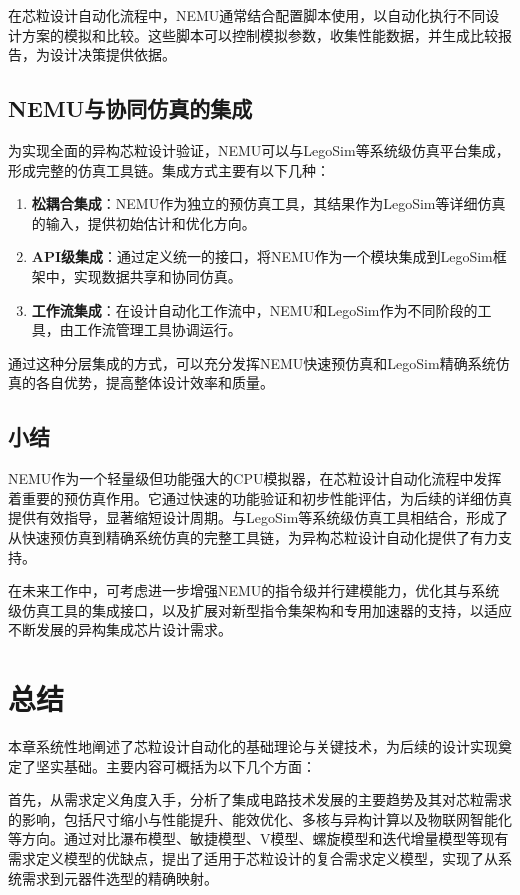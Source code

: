 \documentclass[bachelor]{thesis-uestc}
\begin{document}
在芯粒设计自动化流程中，NEMU通常结合配置脚本使用，以自动化执行不同设计方案的模拟和比较。这些脚本可以控制模拟参数，收集性能数据，并生成比较报告，为设计决策提供依据。

\subsection{NEMU与协同仿真的集成}
为实现全面的异构芯粒设计验证，NEMU可以与LegoSim等系统级仿真平台集成，形成完整的仿真工具链。集成方式主要有以下几种：

\begin{enumerate}
    \item \textbf{松耦合集成}：NEMU作为独立的预仿真工具，其结果作为LegoSim等详细仿真的输入，提供初始估计和优化方向。

    \item \textbf{API级集成}：通过定义统一的接口，将NEMU作为一个模块集成到LegoSim框架中，实现数据共享和协同仿真。

    \item \textbf{工作流集成}：在设计自动化工作流中，NEMU和LegoSim作为不同阶段的工具，由工作流管理工具协调运行。
\end{enumerate}

通过这种分层集成的方式，可以充分发挥NEMU快速预仿真和LegoSim精确系统仿真的各自优势，提高整体设计效率和质量。

\subsection{小结}
NEMU作为一个轻量级但功能强大的CPU模拟器，在芯粒设计自动化流程中发挥着重要的预仿真作用。它通过快速的功能验证和初步性能评估，为后续的详细仿真提供有效指导，显著缩短设计周期。与LegoSim等系统级仿真工具相结合，形成了从快速预仿真到精确系统仿真的完整工具链，为异构芯粒设计自动化提供了有力支持。

在未来工作中，可考虑进一步增强NEMU的指令级并行建模能力，优化其与系统级仿真工具的集成接口，以及扩展对新型指令集架构和专用加速器的支持，以适应不断发展的异构集成芯片设计需求。

\section{总结}

本章系统性地阐述了芯粒设计自动化的基础理论与关键技术，为后续的设计实现奠定了坚实基础。主要内容可概括为以下几个方面：

首先，从需求定义角度入手，分析了集成电路技术发展的主要趋势及其对芯粒需求的影响，包括尺寸缩小与性能提升、能效优化、多核与异构计算以及物联网智能化等方向。通过对比瀑布模型、敏捷模型、V模型、螺旋模型和迭代增量模型等现有需求定义模型的优缺点，提出了适用于芯粒设计的复合需求定义模型，实现了从系统需求到元器件选型的精确映射。
\end{document}
